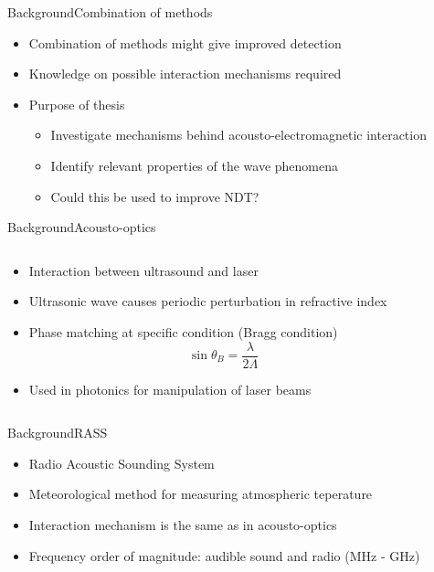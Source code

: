 \documentclass[11pt, final]{beamer}
\begin{document}
	\begin{frame}{Background}{Combination of methods}
		\begin{itemize}
			\item Combination of methods might give improved detection
			\item Knowledge on possible interaction mechanisms required
			\pause
			\item Purpose of thesis
			\begin{itemize}
				\item Investigate mechanisms behind acousto-electromagnetic interaction
				\item Identify relevant properties of the wave phenomena
				\item Could this be used to improve NDT?
			\end{itemize}
		\end{itemize}
	\end{frame}
	
	\begin{frame}{Background}{Acousto-optics}
		\begin{columns}
			\begin{column}{0.6\textwidth}
				\begin{itemize}
					\item<1-> Interaction between ultrasound and laser
					\item<1-> Ultrasonic wave causes periodic perturbation in refractive index
					\item<2-> Phase matching at specific condition (Bragg condition)
					\begin{equation*}
						\sin{\theta_B} = \frac{\lambda}{2\Lambda}
					\end{equation*}
					\item<3-> Used in photonics for manipulation of laser beams
				\end{itemize}
			\end{column}
			\begin{column}{0.4\textwidth}
				\uncover<2->{
					\resizebox{\textwidth}{!}{
						
					}
				}
			\end{column}
		\end{columns}
	\end{frame}
	
	\begin{frame}{Background}{RASS}
		\begin{itemize}
			\item Radio Acoustic Sounding System
			\item Meteorological method for measuring atmospheric teperature
			\pause
			\item Interaction mechanism is the same as in acousto-optics
			\item Frequency order of magnitude: audible sound and radio (MHz - GHz)
		\end{itemize}
	\end{frame}
	
\end{document}

